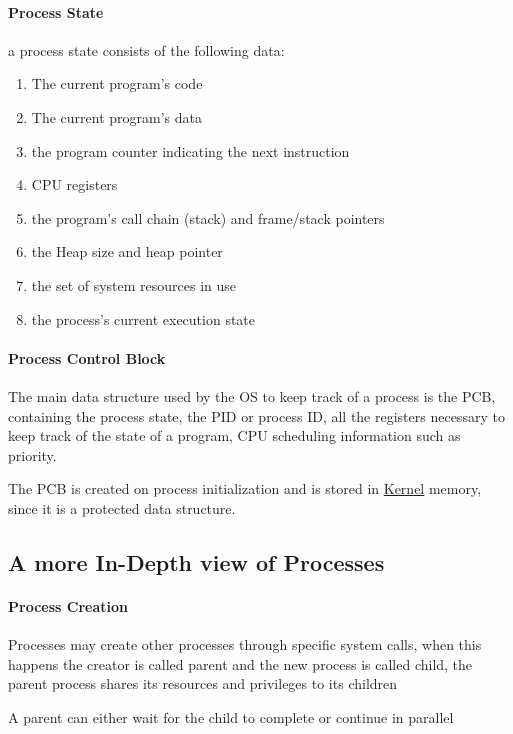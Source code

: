 \documentclass[openright, twoside]{report}
\theoremstyle{definition}
\theoremstyle{example}
\begin{document}
				\paragraph{Process State} a process state consists of the following data:
				\begin{enumerate}
					\item The current program's code
					\item The current program's data 
					\item the program counter indicating the next instruction 
					\item CPU registers 
					\item the program's call chain (stack) and frame/stack pointers 
					\item the Heap size and heap pointer 
					\item the set of system resources in use
					\item the process's current execution state
				\end{enumerate}

				\paragraph{Process Control Block}
				\label{par:PCB}
				The main data structure used by the OS to keep track of a process is 
				the PCB, containing the process state, the PID or process ID,
				all the registers necessary to keep track of the state of a program, 
				CPU scheduling information such as priority.

				The PCB is created on process initialization and is stored in 
				\hyperref[par:kernel]{Kernel} memory, 
				since it is a protected data structure.

		\subsection{A more In-Depth view of Processes}
			\paragraph{Process Creation}
			\label{par:p_creation}
				Processes may create other processes through specific system calls, when this happens 
				the creator is called parent and the new process is called child, the parent process
				shares its resources and privileges to its children

				A parent can either wait for the child to complete or continue in parallel 
\end{document}
